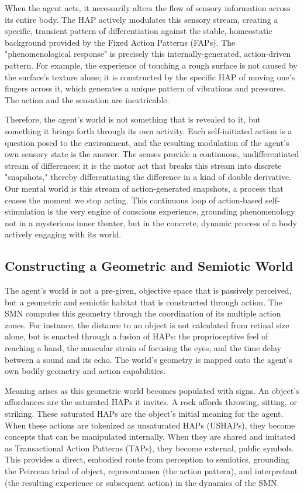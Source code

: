 When the agent acts, it necessarily alters the flow of sensory information across its entire body. The HAP actively modulates this sensory stream, creating a specific, transient pattern of differentiation against the stable, homeostatic background provided by the Fixed Action Patterns (FAPs). The "phenomenological response" is precisely this internally-generated, action-driven pattern. For example, the experience of touching a rough surface is not caused by the surface's texture alone; it is constructed by the specific HAP of moving one's fingers across it, which generates a unique pattern of vibrations and pressures. The action and the sensation are inextricable.

Therefore, the agent's world is not something that is revealed to it, but something it brings forth through its own activity. Each self-initiated action is a question posed to the environment, and the resulting modulation of the agent's own sensory state is the answer. The senses provide a continuous, undifferentiated stream of differences; it is the motor act that breaks this stream into discrete "snapshots," thereby differentiating the difference in a kind of double derivative. Our mental world is this stream of action-generated snapshots, a process that ceases the moment we stop acting. This continuous loop of action-based self-stimulation is the very engine of conscious experience, grounding phenomenology not in a mysterious inner theater, but in the concrete, dynamic process of a body actively engaging with its world.

\subsection{Constructing a Geometric and Semiotic World}
\label{subsec:semiotic_world}
The agent's world is not a pre-given, objective space that is passively perceived, but a geometric and semiotic habitat that is constructed through action. The SMN computes this geometry through the coordination of its multiple action zones. For instance, the distance to an object is not calculated from retinal size alone, but is enacted through a fusion of HAPs: the proprioceptive feel of reaching a hand, the muscular strain of focusing the eyes, and the time delay between a sound and its echo. The world's geometry is mapped onto the agent's own bodily geometry and action capabilities.

Meaning arises as this geometric world becomes populated with signs. An object's affordances are the saturated HAPs it invites. A rock affords throwing, sitting, or striking. These saturated HAPs are the object's initial meaning for the agent. When these actions are tokenized as unsaturated HAPs (USHAPs), they become concepts that can be manipulated internally. When they are shared and imitated as Transactional Action Patterns (TAPs), they become external, public symbols. This provides a direct, embodied route from perception to semiotics, grounding the Peircean triad of object, representamen (the action pattern), and interpretant (the resulting experience or subsequent action) in the dynamics of the SMN.

